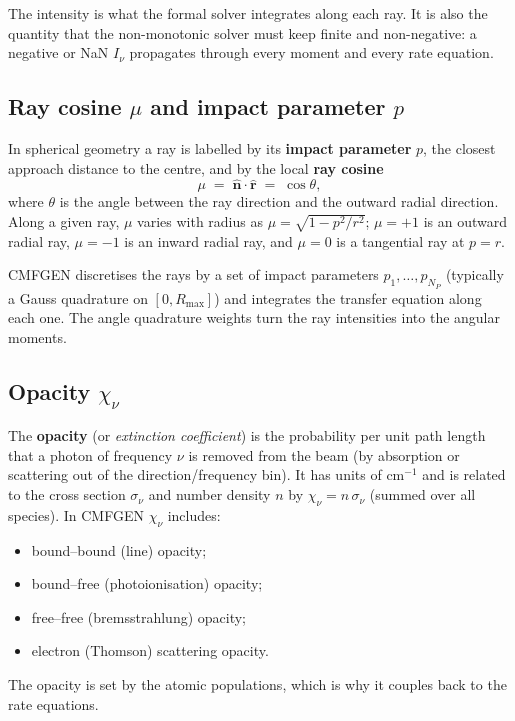 \documentclass[11pt]{article}
\begin{document}
The intensity is what the formal solver integrates along each ray.  It
is also the quantity that the non-monotonic solver must keep finite and
non-negative: a negative or NaN $I_\nu$ propagates through every moment
and every rate equation.

\subsection{Ray cosine \texorpdfstring{$\mu$}{mu} and impact parameter \texorpdfstring{$p$}{p}}

In spherical geometry a ray is labelled by its \textbf{impact parameter}
$p$, the closest approach distance to the centre, and by the local
\textbf{ray cosine}
\begin{equation}
  \mu \;=\; \hat{\mathbf{n}}\cdot\hat{\mathbf{r}}
  \;=\; \cos\theta,
\end{equation}
where $\theta$ is the angle between the ray direction and the outward
radial direction.  Along a given ray, $\mu$ varies with radius as
$\mu = \sqrt{1 - p^{2}/r^{2}}$; $\mu = +1$ is an outward radial ray,
$\mu = -1$ is an inward radial ray, and $\mu = 0$ is a tangential ray at
$p = r$.

CMFGEN discretises the rays by a set of impact parameters
$p_1, \dots, p_{N_P}$ (typically a Gauss quadrature on $[0,R_{\max}]$)
and integrates the transfer equation along each one.  The angle
quadrature weights turn the ray intensities into the angular moments.

\subsection{Opacity \texorpdfstring{$\chi_\nu$}{chi\_nu}}

The \textbf{opacity} (or \emph{extinction coefficient}) is the
probability per unit path length that a photon of frequency $\nu$ is
removed from the beam (by absorption or scattering out of the
direction/frequency bin).  It has units of $\mathrm{cm^{-1}}$ and is
related to the cross section $\sigma_\nu$ and number density $n$ by
$\chi_\nu = n\,\sigma_\nu$ (summed over all species).  In CMFGEN
$\chi_\nu$ includes:
\begin{itemize}[nosep]
  \item bound--bound (line) opacity;
  \item bound--free (photoionisation) opacity;
  \item free--free (bremsstrahlung) opacity;
  \item electron (Thomson) scattering opacity.
\end{itemize}
The opacity is set by the atomic populations, which is why it couples
back to the rate equations.
\end{document}
